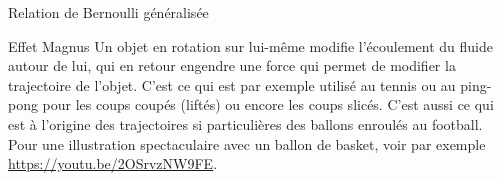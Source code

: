 \begin{exo}[PC][2][TD]{Relation de Bernoulli généralisée}
\begin{quest}
\end{quest}
\end{exo}

\begin{exo}[PC][1][devoir]{Effet Magnus}%
Un objet en rotation sur lui-même modifie l'écoulement du fluide autour de lui, qui en retour engendre une force qui permet de modifier la trajectoire de l'objet. C'est ce qui est par exemple utilisé au tennis ou au ping-pong pour les coups coupés (liftés) ou encore les coups slicés. C'est aussi ce qui est à l'origine des trajectoires si particulières des ballons enroulés au football. Pour une illustration spectaculaire avec un ballon de basket, voir par exemple \url{https://youtu.be/2OSrvzNW9FE}.


\end{exo}

